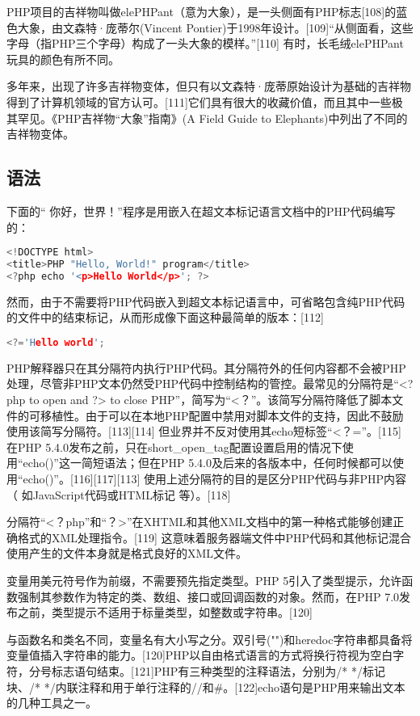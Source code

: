 PHP项目的吉祥物叫做elePHPant（意为大象），是一头侧面有PHP标志[108]的蓝色大象，由文森特·庞蒂尔(Vincent Pontier)于1998年设计。[109]“从侧面看，这些字母（指PHP三个字母）构成了一头大象的模样。”[110] 有时，长毛绒elePHPant玩具的颜色有所不同。

多年来，出现了许多吉祥物变体，但只有以文森特·庞蒂原始设计为基础的吉祥物得到了计算机领域的官方认可。[111]它们具有很大的收藏价值，而且其中一些极其罕见。《PHP吉祥物“大象”指南》(A Field Guide to Elephants)中列出了不同的吉祥物变体。

\subsection{语法}
下面的“ 你好，世界！”程序是用嵌入在超文本标记语言文档中的PHP代码编写的：
\begin{lstlisting}[language=cpp]
<!DOCTYPE html>
<title>PHP "Hello, World!" program</title>
<?php echo '<p>Hello World</p>'; ?>
\end{lstlisting}
然而，由于不需要将PHP代码嵌入到超文本标记语言中，可省略包含纯PHP代码的文件中的结束标记，从而形成像下面这种最简单的版本：[112]
\begin{lstlisting}[language=cpp]
 <?='Hello world';
\end{lstlisting}
PHP解释器只在其分隔符内执行PHP代码。其分隔符外的任何内容都不会被PHP处理，尽管非PHP文本仍然受PHP代码中控制结构的管控。最常见的分隔符是“<?php to open and ?> to close PHP”，简写为“<？”。该简写分隔符降低了脚本文件的可移植性。由于可以在本地PHP配置中禁用对脚本文件的支持，因此不鼓励使用该简写分隔符。[113][114] 但业界并不反对使用其echo短标签“<？=”。[115] 在PHP 5.4.0发布之前，只在short_open_tag配置设置启用的情况下使用“echo()”这一简短语法；但在PHP 5.4.0及后来的各版本中，任何时候都可以使用“echo()”。[116][117][113] 使用上述分隔符的目的是区分PHP代码与非PHP内容（ 如JavaScript代码或HTML标记 等）。[118]

分隔符“<？php”和“？>”在XHTML和其他XML文档中的第一种格式能够创建正确格式的XML处理指令。[119] 这意味着服务器端文件中PHP代码和其他标记混合使用产生的文件本身就是格式良好的XML文件。

变量用美元符号作为前缀，不需要预先指定类型。PHP 5引入了类型提示，允许函数强制其参数作为特定的类、数组、接口或回调函数的对象。然而，在PHP 7.0发布之前，类型提示不适用于标量类型，如整数或字符串。[120]

与函数名和类名不同，变量名有大小写之分。双引号("")和heredoc字符串都具备将变量值插入字符串的能力。[120]PHP以自由格式语言的方式将换行符视为空白字符，分号标志语句结束。[121]PHP有三种类型的注释语法，分别为/* */标记块、/* */内联注释和用于单行注释的//和#。[122]echo语句是PHP用来输出文本的几种工具之一。

